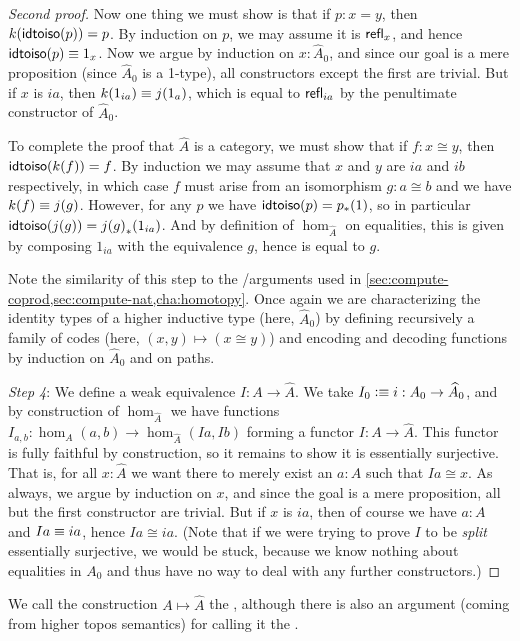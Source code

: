 \begin{proof}[Second proof]
  Now one thing we must show is that if $p:x=y$, then $k(\mathsf{idtoiso}(p))=p$.
  By induction on $p$, we may assume it is $\mathsf{refl}_{x}$, and hence $\mathsf{idtoiso}(p)\equiv 1_x$.
  Now we argue by induction on $x:\widehat A_0$, and since our goal is a mere proposition (since $\widehat A_0$ is a 1-type), all constructors except the first are trivial.
  But if $x$ is $ia$, then $k(1_{ia}) \equiv j(1_a)$, which is equal to $\mathsf{refl}_{ia}$ by the penultimate constructor of $\widehat A_0$.

  To complete the proof that $\widehat A$ is a category, we must show that if $f:x\cong y$, then $\mathsf{idtoiso}(k(f))=f$.
  By induction we may assume that $x$ and $y$ are $ia$ and $ib$ respectively, in which case $f$ must arise from an isomorphism $g:a\cong b$ and we have $k(f)\equiv j(g)$.
  However, for any $p$ we have $\mathsf{idtoiso}(p) = {p}_{*}\mathopen{}\left({1}\right)\mathclose{}$, so in particular $\mathsf{idtoiso} (j(g)) = {j(g)}_{*}\mathopen{}\left({1_{ia}}\right)\mathclose{}$.
  And by definition of $\hom_{\widehat A}$ on equalities, this is given by composing $1_{ia}$ with the equivalence $g$, hence is equal to $g$.

  Note the similarity of this step to the \encode/\decode arguments used in \autoref{sec:compute-coprod,sec:compute-nat,cha:homotopy}.
  Once again we are characterizing the identity types of a higher inductive type (here, $\widehat A_0$) by defining recursively a family of codes (here, $(x,y)\mapsto (x\cong y)$) and encoding and decoding functions by induction on $\widehat A_0$ and on paths.

  \mentalpause

  \emph{Step 4}: We define a weak equivalence $I:A \to \widehat A$.
  We take $I_0 \vcentcolon\equiv i : A_0 \to \widehat A_0$, and by construction of $\hom_{\widehat A}$ we have functions $I_{a,b}:\hom_A(a,b) \to \hom_{\widehat A}(Ia,Ib)$ forming a functor $I:A \to \widehat A$.
  This functor is fully faithful by construction, so it remains to show it is essentially surjective.
  That is, for all $x:\widehat A$ we want there to merely exist an $a:A$ such that $Ia\cong x$.
  As always, we argue by induction on $x$, and since the goal is a mere proposition, all but the first constructor are trivial.
  But if $x$ is $ia$, then of course we have $a:A$ and $Ia\equiv ia$, hence $Ia \cong ia$.
  (Note that if we were trying to prove $I$ to be \emph{split} essentially surjective, we would be stuck, because we know nothing about equalities in $A_0$ and thus have no way to deal with any further constructors.)
\end{proof}

We call the construction $A\mapsto \widehat A$ the , although there is also an argument (coming from higher topos semantics) for calling it the .

